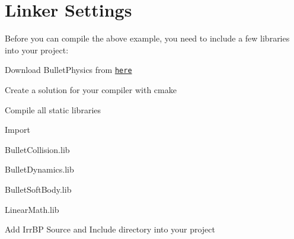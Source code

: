 \hypertarget{index_linker}{}\section{Linker Settings}\label{index_linker}
Before you can compile the above example, you need to include a few libraries into your project: 
\begin{DoxyEnumerate}
\item Download BulletPhysics from \href{http://code.google.com/p/bullet/downloads/list}{\tt here} 
\item Create a solution for your compiler with cmake 
\item Compile all static libraries 
\item Import 
\begin{DoxyItemize}
\item BulletCollision.lib 
\item BulletDynamics.lib 
\item BulletSoftBody.lib 
\item LinearMath.lib 
\end{DoxyItemize}
\item Add IrrBP Source and Include directory into your project 
\end{DoxyEnumerate}